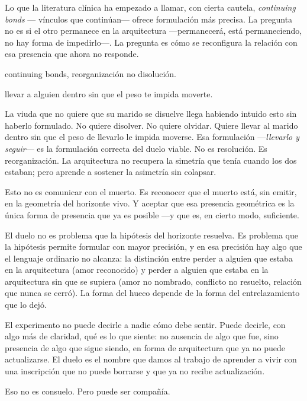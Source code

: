 \noindent Lo que la literatura clínica ha empezado a llamar, con cierta cautela, \emph{continuing bonds} — vínculos que continúan— ofrece formulación más precisa. La pregunta no es si el otro permanece en la arquitectura —permanecerá, está permaneciendo, no hay forma de impedirlo—. La pregunta es cómo se reconfigura la relación con esa presencia que ahora no responde.

\begin{fisica}
 continuing bonds, reorganización no disolución.

 llevar a alguien dentro sin que el peso te impida moverte.
\end{fisica}
La viuda que no quiere que su marido se disuelve llega habiendo intuido esto sin haberlo formulado. No quiere disolver. No quiere olvidar. Quiere llevar al marido dentro sin que el peso de llevarlo le impida moverse. Esa formulación —\emph{llevarlo y seguir}— es la formulación correcta del duelo viable. No es resolución. Es reorganización. La arquitectura no recupera la simetría que tenía cuando los dos estaban; pero aprende a sostener la asimetría sin colapsar.

Esto no es comunicar con el muerto. Es reconocer que el muerto está, sin emitir, en la geometría del horizonte vivo. Y aceptar que esa presencia geométrica es la única forma de presencia que ya es posible —y que es, en cierto modo, suficiente.

\noindent El duelo no es problema que la hipótesis del horizonte resuelva. Es problema que la hipótesis permite formular con mayor precisión, y en esa precisión hay algo que el lenguaje ordinario no alcanza: la distinción entre perder a alguien que estaba en la arquitectura (amor reconocido) y perder a alguien que estaba en la arquitectura sin que se supiera (amor no nombrado, conflicto no resuelto, relación que nunca se cerró). La forma del hueco depende de la forma del entrelazamiento que lo dejó.

El experimento no puede decirle a nadie cómo debe sentir. Puede decirle, con algo más de claridad, qué es lo que siente: no ausencia de algo que fue, sino presencia de algo que sigue siendo, en forma de arquitectura que ya no puede actualizarse. El duelo es el nombre que damos al trabajo de aprender a vivir con una inscripción que no puede borrarse y que ya no recibe actualización.

Eso no es consuelo. Pero puede ser compañía.

